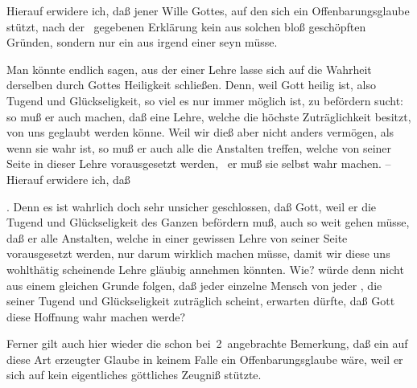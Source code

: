 Hierauf erwidere ich, daß jener Wille Gottes, auf den sich ein Offenbarungsglaube stützt, nach der \ gegebenen Erklärung kein aus solchen bloß  geschöpften Gründen, sondern nur ein aus irgend einer  seyn müsse.
\begin{aufza}\setcounter{enumi}{2}
\item Man könnte endlich sagen, aus der  einer Lehre lasse sich auf die Wahrheit derselben  durch Gottes Heiligkeit schließen. Denn, weil Gott heilig ist, also Tugend und Glückseligkeit, so viel es nur immer möglich ist, zu befördern sucht: so muß er auch machen, daß eine Lehre, welche die höchste Zuträglichkeit besitzt, von uns geglaubt werden könne. Weil wir dieß aber nicht anders vermögen, als wenn sie wahr ist, so muß er auch alle die Anstalten treffen, welche von seiner Seite in dieser Lehre vorausgesetzt werden, \dh\ er muß sie selbst wahr machen. -- Hierauf erwidere ich, daß
\begin{aufzb}
\item {}. Denn es ist wahrlich doch sehr unsicher geschlossen, daß Gott, weil er die Tugend und Glückseligkeit des Ganzen befördern muß, auch so weit gehen müsse, daß er alle Anstalten, welche in einer gewissen Lehre von seiner Seite vorausgesetzt werden, nur darum wirklich machen müsse, damit wir diese uns wohlthätig scheinende Lehre gläubig annehmen könnten. Wie? würde denn nicht aus einem gleichen Grunde folgen, daß jeder einzelne Mensch von jeder , die seiner Tugend und Glückseligkeit zuträglich scheint, erwarten dürfte, daß Gott diese Hoffnung wahr machen werde?
\item Ferner gilt auch hier wieder die schon bei \no\,2\ angebrachte Bemerkung, daß ein auf diese Art erzeugter Glaube in keinem Falle ein Offenbarungsglaube wäre, weil er sich auf kein eigentliches göttliches Zeugniß stützte.
\end{aufzb}
\end{aufza}

